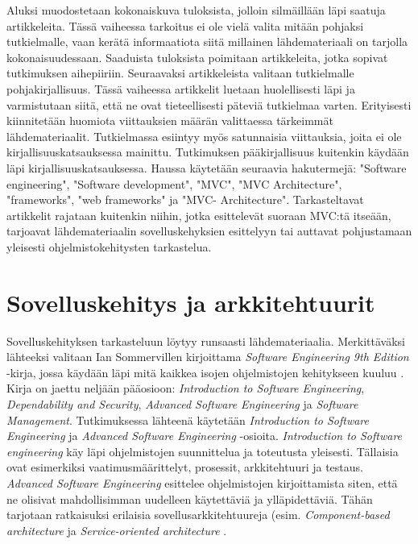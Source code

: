\documentclass[utf8]{gradu3}
\begin{document}
Aluksi muodostetaan kokonaiskuva tuloksista, jolloin silmäillään läpi
saatuja artikkeleita. Tässä vaiheessa tarkoitus ei ole vielä valita
mitään pohjaksi tutkielmalle, vaan kerätä informaatiota siitä
millainen lähdemateriaali on tarjolla kokonaisuudessaan. Saaduista 
tuloksista poimitaan artikkeleita, jotka sopivat tutkimuksen aihepiiriin.
Seuraavaksi artikkeleista valitaan tutkielmalle
pohjakirjallisuus. Tässä vaiheessa artikkelit luetaan huolellisesti
läpi ja varmistutaan siitä, että ne ovat tieteellisesti päteviä
tutkielmaa varten. Erityisesti kiinnitetään huomiota viittauksien
määrän valittaessa tärkeimmät lähdemateriaalit. Tutkielmassa esiintyy myös satunnaisia viittauksia,
joita ei ole kirjallisuuskatsauksessa mainittu. Tutkimuksen
pääkirjallisuus kuitenkin käydään läpi kirjallisuuskatsauksessa.
Haussa käytetään seuraavia hakutermejä: "Software engineering", "Software development", "MVC", "MVC Architecture",
"frameworks", "web frameworks" ja  "MVC- Architecture".
Tarkasteltavat artikkelit rajataan kuitenkin niihin,
jotka esittelevät suoraan MVC:tä itseään, tarjoavat
lähdemateriaalin sovelluskehyksien esittelyyn tai auttavat pohjustamaan yleisesti ohjelmistokehitysten tarkastelua.

\section{Sovelluskehitys ja arkkitehtuurit}
Sovelluskehityksen tarkasteluun löytyy runsaasti lähdemateriaalia. Merkittäväksi lähteeksi valitaan Ian Sommervillen kirjoittama \textit{Software Engineering 9th Edition} -kirja, jossa käydään läpi mitä kaikkea isojen ohjelmistojen kehitykseen kuuluu \parencite{Sommerville}. Kirja on jaettu neljään pääosioon: \textit{Introduction to Software Engineering}, \textit{Dependability and Security}, \textit{Advanced Software Engineering} ja \textit{Software Management}. Tutkimuksessa lähteenä käytetään \textit{Introduction to Software Engineering} ja \textit{Advanced Software Engineering} -osioita. \textit{Introduction to Software engineering} käy läpi ohjelmistojen suunnittelua ja toteutusta yleisesti. Tällaisia ovat esimerkiksi vaatimusmäärittelyt, prosessit, arkkitehtuuri ja testaus. \textit{Advanced Software Engineering} esittelee ohjelmistojen kirjoittamista siten, että ne olisivat mahdollisimman uudelleen käytettäviä ja ylläpidettäviä. Tähän tarjotaan ratkaisuksi erilaisia sovellusarkkitehtuureja (esim.  \textit{Component-based architecture} ja \textit{Service-oriented architecture} \parencite{Sommerville}.
\end{document}
